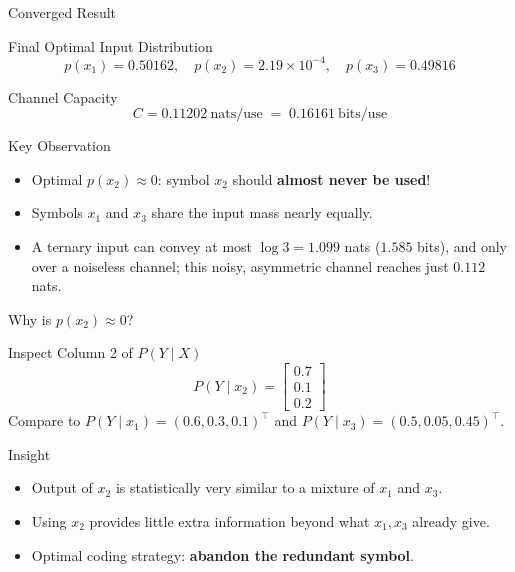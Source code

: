\documentclass{beamer}
\begin{document}
\begin{frame}{Converged Result}
    \begin{exampleblock}{Final Optimal Input Distribution}
        $$
            p(x_1) = 0.50162,\quad p(x_2) = 2.19\!\times\!10^{-4},\quad p(x_3) = 0.49816
        $$
    \end{exampleblock}

    \begin{block}{Channel Capacity}
        $$
            \boxed{\; C = 0.11202~\text{nats/use} \;=\; 0.16161~\text{bits/use} \;}
        $$
    \end{block}

    \begin{alertblock}{Key Observation}
        \begin{itemize}
            \item Optimal $p(x_2) \approx 0$: symbol $x_2$ should \textbf{almost never be used}!
            \item Symbols $x_1$ and $x_3$ share the input mass nearly equally.
            \item A ternary input can convey at most $\log 3 = 1.099$ nats ($1.585$ bits), and only over a noiseless channel; this noisy, asymmetric channel reaches just $0.112$ nats.
        \end{itemize}
    \end{alertblock}
\end{frame}

\begin{frame}{Why is $p(x_2) \approx 0$?}
    \begin{block}{Inspect Column 2 of $P(Y \mid X)$}
        $$
            P(Y \mid x_2) = \begin{bmatrix} 0.7 \\ 0.1 \\ 0.2 \end{bmatrix}
        $$
        Compare to $P(Y \mid x_1) = (0.6, 0.3, 0.1)^\top$ and $P(Y \mid x_3) = (0.5, 0.05, 0.45)^\top$.
    \end{block}

    \begin{exampleblock}{Insight}
        \begin{itemize}
            \item Output of $x_2$ is statistically very similar to a mixture of $x_1$ and $x_3$.
            \item Using $x_2$ provides little extra information beyond what $x_1, x_3$ already give.
            \item Optimal coding strategy: \textbf{abandon the redundant symbol}.
        \end{itemize}
    \end{exampleblock}
\end{frame}
\end{document}
